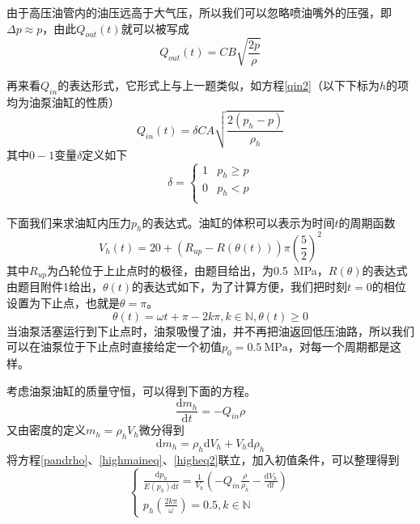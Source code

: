 \documentclass[12pt,AutoFakeBold]{article}%
\newcommand{\dif}{\mathrm{d}}
\begin{document}
    由于高压油管内的油压远高于大气压，所以我们可以忽略喷油嘴外的压强，即$\Delta p\approx p$，由此$Q_{out}(t)$就可以被写成
    \begin{equation}
        Q_{out}(t)=CB\sqrt{\frac{2p}{\rho}}
    \end{equation}\par
    再来看$Q_{in}$的表达形式，它形式上与上一题类似，如方程\ref{qin2}（以下下标为$h$的项均为油泵油缸的性质）
    \begin{equation}
        Q_{in}(t)=\delta CA\sqrt{\frac{2(p_h-p)}{\rho_h}}
        \label{qin2}
    \end{equation}
    其中$0-1$变量$\delta$定义如下
    \begin{equation}
        \delta=
        \begin{cases}
            1&p_h\geq p\\
            0&p_h<p\\
        \end{cases}
    \end{equation}\par
    下面我们来求油缸内压力$p_h$的表达式。油缸的体积可以表示为时间$t$的周期函数
    \begin{equation}
        V_h(t)=20+(R_{up}-R(\theta(t)))\pi\left(\frac{5}{2}\right)^2
    \end{equation}
    其中$R_{up}$为凸轮位于上止点时的极径，由题目给出，为\SI{0.5}{\MPa}，$R(\theta)$的表达式由题目附件1给出，$\theta(t)$的表达式如下，为了计算方便，我们把时刻$t=0$的相位设置为下止点，也就是$\theta = \pi$。
    \begin{equation}
        \theta(t)=\omega t+\pi -2k\pi,k\in\mathbb{N},\theta(t)\geq0
    \end{equation}
    当油泵活塞运行到下止点时，油泵吸慢了油，并不再把油返回低压油路，所以我们可以在油泵位于下止点时直接给定一个初值$p_0=\SI{0.5}{\MPa}$，对每一个周期都是这样。\par
    考虑油泵油缸的质量守恒，可以得到下面的方程。
    \begin{equation}
        \frac{\dif m_h}{\dif t}=-Q_{in}\rho
        \label{highmaineq}
    \end{equation}
    又由密度的定义$m_h=\rho_hV_h$微分得到
    \begin{equation}
        \dif m_h=\rho_h\dif V_h+V_h\dif\rho_h
        \label{higheq2}
    \end{equation}
    将方程\ref{pandrho}、\ref{highmaineq}、\ref{higheq2}联立，加入初值条件，可以整理得到
    \begin{equation}
        \begin{cases}
            \frac{\dif p_h}{E(p_h)\dif t}=\frac{1}{V_h}\left(-Q_{in}\frac{\rho}{\rho_h}-\frac{\dif V_h}{\dif t}\right)\\
            p_h(\frac{2k\pi}{\omega})=0.5,k\in\mathbb{N}
        \end{cases}
        \label{highmaineq2}
    \end{equation}\par
\end{document}
